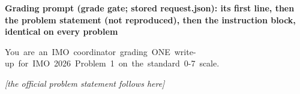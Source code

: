 \providecommand{\CRPromptLabel}[1]{\par\smallskip\noindent\textbf{\small #1}\par}
\providecommand{\CRPromptNote}[1]{\par\noindent\textit{\small #1}\par}
\CRPromptLabel{Grading prompt (grade gate; stored request.json): its first line, then the problem statement (not reproduced), then the instruction block, identical on every problem}
\begin{flushleft}\ttfamily\scriptsize{}
{}You\ are\ an\ IMO\ coordinator\ grading\ ONE\ write-{}up\ for\ IMO\ 2026\ Problem\ 1\ on\ the\ standard\ 0-{}7\ scale.\\
\end{flushleft}
\CRPromptNote{[the official problem statement follows here]}
